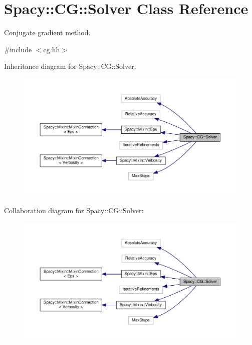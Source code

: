 \hypertarget{classSpacy_1_1CG_1_1Solver}{}\section{Spacy\+:\+:CG\+:\+:Solver Class Reference}
\label{classSpacy_1_1CG_1_1Solver}


Conjugate gradient method.  




{\ttfamily \#include $<$cg.\+hh$>$}



Inheritance diagram for Spacy\+:\+:CG\+:\+:Solver\+:
\nopagebreak
\begin{figure}[H]
\begin{center}
\leavevmode
\includegraphics[width=350pt]{classSpacy_1_1CG_1_1Solver__inherit__graph}
\end{center}
\end{figure}


Collaboration diagram for Spacy\+:\+:CG\+:\+:Solver\+:
\nopagebreak
\begin{figure}[H]
\begin{center}
\leavevmode
\includegraphics[width=350pt]{classSpacy_1_1CG_1_1Solver__coll__graph}
\end{center}
\end{figure}
